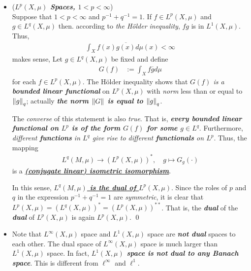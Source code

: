 \documentclass[11pt]{article}
\begin{document}
\begin{itemize}
\item  \begin{example} (\emph{\textbf{$L^{p}(X, \mu)$ Spaces, $1 < p < \infty$}})\\
Suppose that \underline{$1 < p < \infty$} and \underline{$p^{-1} + q^{-1} = 1$}. If $f \in L^{p}(X, \mu)$ and $g \in L^{q}(X, \mu)$ then. according to \emph{the H{\"o}lder inequality}, $fg$ is in $L^1(X, \mu)$.  Thus,
\begin{align*}
\int_{X} f(x) \overline{g(x)} d\mu(x) < \infty
\end{align*} makes sense, Let $g \in L^{q}(X, \mu)$ be fixed and define
\begin{align*}
G(f) &:= \int_{X} f \overline{g}  d\mu
\end{align*} for each $f \in L^{p}(X, \mu)$.  The H{\"o}lder inequality shows that \emph{$G(f)$ is a \textbf{bounded linear functional}} on $L^{p}(X, \mu)$ with \emph{norm} less than or equal to $\left\|g\right\|_{q}$; actually \emph{\textbf{the norm $\left\|G\right\|_{}$ is equal to $\left\|g\right\|_{q}$}}. 

The \emph{converse} of this statement is also \emph{true}. That is, \emph{\textbf{every
bounded linear functional on $L^{p}$ is of the form $G(f)$ for some $g \in L^{q}$}}. Furthermore, \emph{different \textbf{functions} in $L^q$ give rise to different \textbf{functionals} on $L^{p}$}. Thus, the mapping 
\begin{align*}
L^q(M, \mu) \rightarrow (L^{p}(X, \mu))^{*}, \quad g \mapsto G_{g}(\cdot)
\end{align*}  is a \underline{\emph{\textbf{(conjugate linear) isometric isomorphism}}}. 

In this sense, \underline{\emph{\textbf{$L^q(M, \mu)$ is the dual of $L^{p}(X, \mu)$}}}.  Since the roles of $p$ and $q$ in the expression $p^{-1} + q^{-1} = 1$ are \emph{symmetric}, it is clear that $L^{p}(X, \mu) = (L^{q}(X, \mu))^{*} =  (L^{p}(X, \mu))^{**}$. That is, the \emph{\textbf{dual}} of the \emph{\textbf{dual}} of $L^{p}(X, \mu)$ is again $L^{p}(X, \mu)$. \qed
\end{example}

\item \begin{remark}
Note that $L^{\infty}(X, \mu)$ space and $L^{1}(X, \mu)$ space are \emph{\textbf{not dual}} spaces to each other. The dual space of $L^{\infty}(X, \mu)$ space is much larger than $L^{1}(X, \mu)$ space. In fact, \emph{\textbf{$L^{1}(X, \mu)$ space is not dual to any Banach space}}.  This is different from $\ell^{\infty}$ and $\ell^1$.
\end{remark}


\end{itemize}
\end{document}
